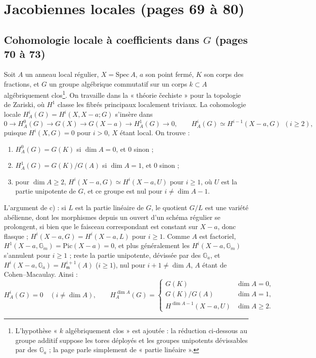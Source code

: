\documentclass[11pt,a4paper]{article}
\begin{document}
\section*{Jacobiennes locales (pages 69 à 80)}

\subsection*{Cohomologie locale à coefficients dans $G$ (pages 70 à 73)}

Soit $A$ un anneau local régulier, $X = \mathrm{Spec}\,A$, $a$ son point fermé,
$K$ son corps des fractions, et $G$ un groupe algébrique commutatif sur un corps
$k \subset A$ algébriquement clos\footnote{L'hypothèse « $k$ algébriquement clos »
est ajoutée : la réduction ci-dessous au groupe additif suppose les tores
déployés et les groupes unipotents dévissables par des $\mathbb{G}_a$ ; la page
parle simplement de « partie linéaire ».}. On travaille dans la « théorie
čechiste » pour la topologie de Zariski, où $H^1$ classe les fibrés principaux
localement triviaux. La cohomologie locale $H^i_A(G) = H^i(X, X - a; G)$
s'insère dans
\[
0 \to H^0_A(G) \to G(X) \to G(X - a) \to H^1_A(G) \to 0,
\qquad
H^i_A(G) \simeq H^{i-1}(X - a, G)\ \ (i \geq 2),
\]
puisque $H^i(X, G) = 0$ pour $i > 0$, $X$ étant local. On trouve :
\begin{enumerate}
\item[a)] $H^0_A(G) = G(K)$ si $\dim A = 0$, et $0$ sinon ;
\item[b)] $H^1_A(G) = G(K)/G(A)$ si $\dim A = 1$, et $0$ sinon ;
\item[c)] pour $\dim A \geq 2$, $H^i(X - a, G) \simeq H^i(X - a, U)$ pour $i \geq 1$,
où $U$ est la partie unipotente de $G$, et ce groupe est nul pour $i \neq
\dim A - 1$.
\end{enumerate}
L'argument de c) : si $L$ est la partie linéaire de $G$, le quotient $G/L$ est
une variété abélienne, dont les morphismes depuis un ouvert d'un schéma régulier
se prolongent, si bien que le faisceau correspondant est constant sur $X - a$,
donc flasque ; $H^i(X - a, G) = H^i(X - a, L)$ pour $i \geq 1$. Comme $A$ est
factoriel, $H^1(X - a, \mathbb{G}_m) = \mathrm{Pic}(X - a) = 0$, et plus
généralement les $H^i(X - a, \mathbb{G}_m)$ s'annulent pour $i \geq 1$ ; reste la
partie unipotente, dévissée par des $\mathbb{G}_a$, et $H^i(X - a, \mathbb{G}_a) =
H^{i+1}_{\mathfrak{m}}(A)$ ($i \geq 1$), nul pour $i + 1 \neq \dim A$, $A$ étant de
Cohen–Macaulay. Ainsi :
\[
H^i_A(G) = 0 \quad (i \neq \dim A),
\qquad
H^{\dim A}_A(G) =
\begin{cases}
G(K) & \dim A = 0, \\
G(K)/G(A) & \dim A = 1, \\
H^{\dim A - 1}(X - a, U) & \dim A \geq 2.
\end{cases}
\]
\end{document}

